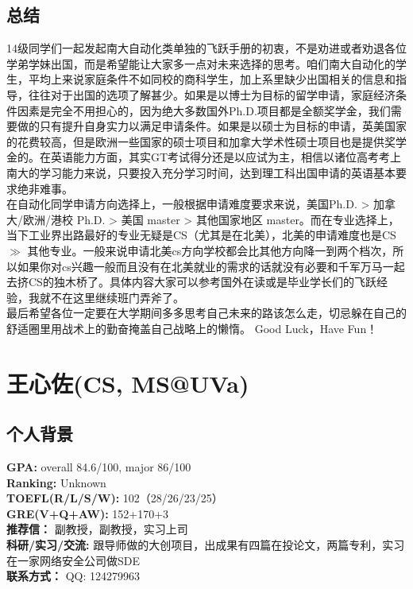 \documentclass[a4paper,UTF8]{book}
\begin{document}
    \subsection*{总结}
    14级同学们一起发起南大自动化类单独的飞跃手册的初衷，不是劝进或者劝退各位学弟学妹出国，而是希望能让大家多一点对未来选择的思考。咱们南大自动化的学生，平均上来说家庭条件不如同校的商科学生，加上系里缺少出国相关的信息和指导，往往对于出国的选项了解甚少。如果是以博士为目标的留学申请，家庭经济条件因素是完全不用担心的，因为绝大多数国外Ph.D.项目都是全额奖学金，我们需要做的只有提升自身实力以满足申请条件。如果是以硕士为目标的申请，英美国家的花费较高，但是欧洲一些国家的硕士项目和加拿大学术性硕士项目也是提供奖学金的。在英语能力方面，其实GT考试得分还是以应试为主，相信以诸位高考考上南大的学习能力来说，只要投入充分学习时间，达到理工科出国申请的英语基本要求绝非难事。\\
    在自动化同学申请方向选择上，一般根据申请难度要求来说，美国Ph.D. > 加拿大/欧洲/港校 Ph.D. > 美国 master > 其他国家地区 master。而在专业选择上，当下工业界出路最好的专业无疑是CS（尤其是在北美），北美的申请难度也是CS $\gg$ 其他专业。一般来说申请北美cs方向学校都会比其他方向降一到两个档次，所以如果你对cs兴趣一般而且没有在北美就业的需求的话就没有必要和千军万马一起去挤CS的独木桥了。具体内容大家可以参考国外在读或是毕业学长们的飞跃经验，我就不在这里继续班门弄斧了。\\
    最后希望各位一定要在大学期间多多思考自己未来的路该怎么走，切忌躲在自己的舒适圈里用战术上的勤奋掩盖自己战略上的懒惰。
    Good Luck，Have Fun！
    

\clearpage
\section{王心佐(CS, MS@UVa)}
    \subsection*{个人背景}
        \textbf{GPA:} overall 84.6/100, major 86/100\\
        \textbf{Ranking:} Unknown\\
        \textbf{TOEFL(R/L/S/W):} 102（28/26/23/25）\\
        \textbf{GRE(V+Q+AW):} 152+170+3\\
        \textbf{推荐信：} 副教授，副教授，实习上司\\
        \textbf{科研/实习/交流:} 跟导师做的大创项目，出成果有四篇在投论文，两篇专利，实习在一家网络安全公司做SDE\\ 
        \textbf{联系方式：} QQ: 124279963
\end{document}
